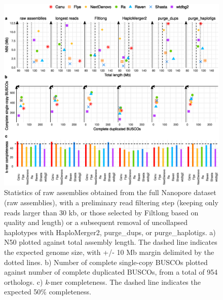 \begin{suppsection}
 
 \begin{figure}[ht]
    \centering
     \includegraphics[width=13.5cm]{fig/benchmark/nanopore_all_v20210317.eps}
   \caption{Statistics of raw assemblies obtained from the full Nanopore dataset (raw assemblies), with a preliminary read filtering step (keeping only reads larger than 30 kb, or those selected by Filtlong based on quality and length) or a subsequent removal of uncollapsed haplotypes with HaploMerger2, purge\_dups, or purge\_haplotigs. a) N50 plotted against total assembly length. The dashed line indicates the expected genome size, with +/- 10 Mb margin delimited by the dotted lines. b) Number of complete single-copy BUSCOs plotted against number of complete duplicated BUSCOs, from a total of 954 orthologs. c) \textit{k}-mer completeness. The dashed line indicates the expected 50\% completeness.}
   \label{fig:nanopore_full_stats}
 \end{figure}
 

\end{suppsection}
